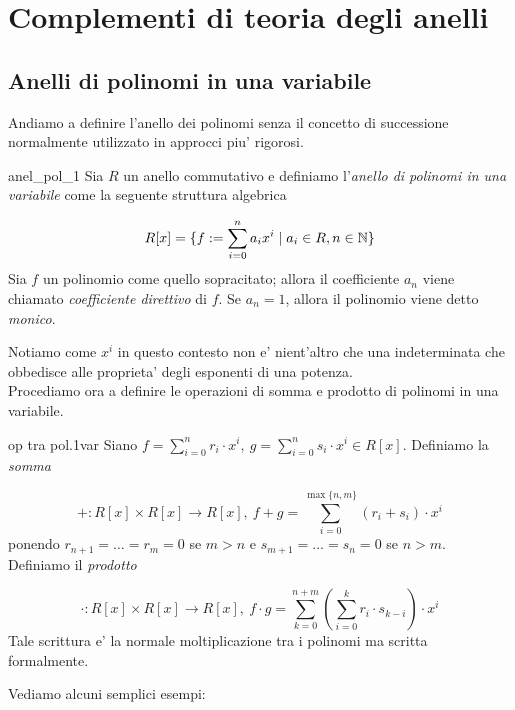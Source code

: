 \section{Complementi di teoria degli anelli}

\subsection{Anelli di polinomi in una variabile}

Andiamo a definire l'anello dei polinomi senza il concetto di successione normalmente 
utilizzato in approcci piu' rigorosi.


\begin{defn}{anel_pol_1}
Sia $R$ un anello commutativo e definiamo l'\emph{anello di polinomi in una variabile}
come la seguente struttura algebrica

\begin{equation}
R[x] = \{ f:= \sum\limits_{i=0}^{n}a_i x^i \mid a_i \in R, n\in \mathbb{N}\} 
\end{equation}
Sia $f$ un polinomio come quello sopracitato; allora il coefficiente $a_n$ viene chiamato 
\emph{coefficiente direttivo} di $f$. Se $a_n=1$, allora il polinomio viene detto \emph{monico}.
\end{defn}
Notiamo come $x^i$ in questo contesto non e' nient'altro che una indeterminata che
obbedisce alle proprieta' degli esponenti di una potenza. \\
Procediamo ora a definire le operazioni di somma e prodotto di polinomi in una variabile.

\begin{defn}{op tra pol.1var}
Siano $f = \sum_{i=0}^{n}r_i \cdot x^i,\ g = \sum_{i=0}^{n}s_i \cdot x^i \in R[x]$. 
Definiamo la \emph{somma}

\begin{equation}
+ : R[x] \times R[x] \to R[x],\ f + g = \sum\limits_{i=0}^{\max\{n,m\}} (r_i + s_i) \cdot x^i
\end{equation}
ponendo $r_{n+1} = \dots = r_m = 0$ se $m > n$ e $s_{m+1} = \dots = s_n = 0$ se $n > m$.\\
Definiamo il \emph{prodotto}

\begin{equation}
  \cdot : R[x] \times R[x] \to R[x],\ f\cdot g = \sum\limits_{k=0}^{n+m} (\sum\limits_{i=0}^{k} r_i \cdot s_{k-i}) \cdot x^i
\end{equation}
Tale scrittura e' la normale moltiplicazione tra i polinomi ma scritta formalmente.
\end{defn}
Vediamo alcuni semplici esempi: 


